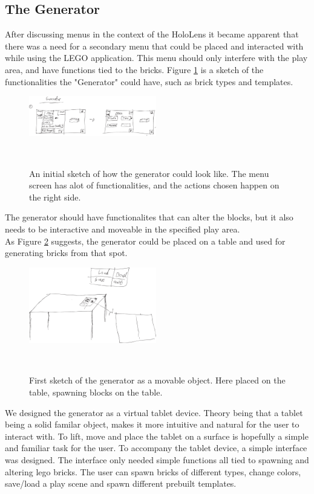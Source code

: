 \subsection{The Generator}
After discussing menus in the context of the HoloLens it became apparent that there was a need for a secondary menu that could be placed and interacted with while using the LEGO application. This menu should only interfere with the play area, and have functions tied to the bricks. Figure \ref{fig:genboard1} is a sketch of the functionalities the "Generator" could have, such as brick types and templates.
\begin{figure}[t]
	\centering
	\includegraphics[width=210px]{figures/Generator/gen5_1.pdf}
	\caption{An initial sketch of how the generator could look like. The menu screen has alot of functionalities, and the actions chosen happen on the right side.}~\label{fig:genboard1}
\end{figure}
The generator should have functionalites that can alter the blocks, but it also needs to be interactive and moveable in the specified play area.\\
As Figure \ref{fig:gentablet} suggests, the generator could be placed on a table and used for generating bricks from that spot.
\begin{figure}[t]
	\centering
	\includegraphics[width=210px]{figures/Generator/gen6_1.pdf}
	\caption{First sketch of the generator as a movable object. Here placed on the table, spawning blocks on the table.}~\label{fig:gentablet}
\end{figure}
We designed the generator as a virtual tablet device. Theory being that a tablet being a solid familar object, makes it more intuitive and natural for the user to interact with. To lift, move and place the tablet on a surface is hopefully a simple and familiar task for the user. To accompany the tablet device, a simple interface was designed. The interface only needed simple functions all tied to spawning and altering lego bricks. The user can spawn bricks of different types, change colors, save/load a play scene and spawn different prebuilt templates.
